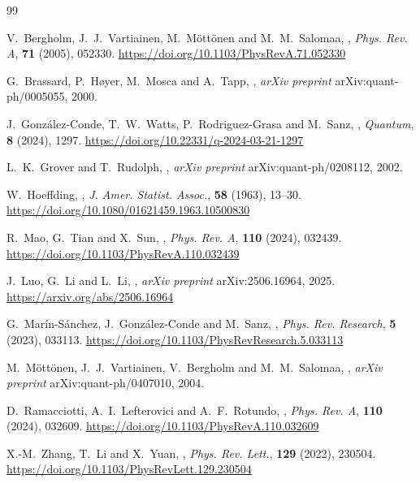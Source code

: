 \documentclass{article}
\numberwithin{equation}{section}
\begin{document}
\begin{thebibliography}{99}

V.~Bergholm, J.~J.~Vartiainen, M.~M{\"o}tt{\"o}nen and M.~M.~Salomaa,
,
\newblock \emph{Phys. Rev. A}, \textbf{71} (2005), 052330.
\newblock \url{https://doi.org/10.1103/PhysRevA.71.052330}

G.~Brassard, P.~H{\o}yer, M.~Mosca and A.~Tapp,
,
\newblock \emph{arXiv preprint} arXiv:quant-ph/0005055, 2000.

J.~Gonz{\'a}lez-Conde, T.~W.~Watts, P.~Rodriguez-Grasa and M.~Sanz,
,
\newblock \emph{Quantum}, \textbf{8} (2024), 1297.
\newblock \url{https://doi.org/10.22331/q-2024-03-21-1297}

L.~K.~Grover and T.~Rudolph,
,
\newblock \emph{arXiv preprint} arXiv:quant-ph/0208112, 2002.

W.~Hoeffding,
,
\newblock \emph{J. Amer. Statist. Assoc.}, \textbf{58} (1963), 13--30.
\newblock \url{https://doi.org/10.1080/01621459.1963.10500830}

R.~Mao, G.~Tian and X.~Sun,
,
\newblock \emph{Phys. Rev. A}, \textbf{110} (2024), 032439.
\newblock \url{https://doi.org/10.1103/PhysRevA.110.032439}

J.~Luo, G.~Li and L.~Li,
,
\newblock \emph{arXiv preprint} arXiv:2506.16964, 2025.
\newblock \url{https://arxiv.org/abs/2506.16964}

G.~Mar{\'i}n-S{\'a}nchez, J.~Gonz{\'a}lez-Conde and M.~Sanz,
,
\newblock \emph{Phys. Rev. Research}, \textbf{5} (2023), 033113.
\newblock \url{https://doi.org/10.1103/PhysRevResearch.5.033113}

M.~M{\"o}tt{\"o}nen, J.~J.~Vartiainen, V.~Bergholm and M.~M.~Salomaa,
,
\newblock \emph{arXiv preprint} arXiv:quant-ph/0407010, 2004.

D.~Ramacciotti, A.~I.~Lefterovici and A.~F.~Rotundo,
,
\newblock \emph{Phys. Rev. A}, \textbf{110} (2024), 032609.
\newblock \url{https://doi.org/10.1103/PhysRevA.110.032609}

X.-M.~Zhang, T.~Li and X.~Yuan,
,
\newblock \emph{Phys. Rev. Lett.}, \textbf{129} (2022), 230504.
\newblock \url{https://doi.org/10.1103/PhysRevLett.129.230504}

\end{thebibliography}
\end{document}
